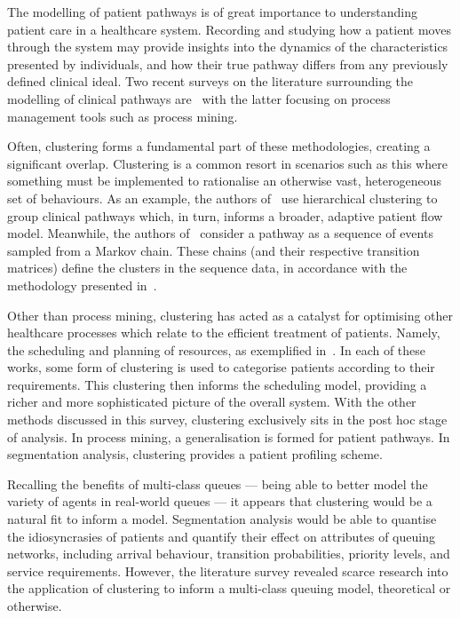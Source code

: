 The modelling of patient pathways is of great importance to understanding
patient care in a healthcare system. Recording and studying how a patient moves
through the system may provide insights into the dynamics of the characteristics
presented by individuals, and how their true pathway differs from any previously
defined clinical ideal. Two recent surveys on the literature surrounding the
modelling of clinical pathways are~\cite{Aspland2019,DeRamonFernandez2019} with
the latter focusing on process management tools such as process mining.

Often, clustering forms a fundamental part of these methodologies, creating a
significant overlap. Clustering is a common resort in scenarios such as
this where something must be implemented to rationalise an otherwise vast,
heterogeneous set of behaviours. As an example, the authors
of~\cite{Prokofyeva2020} use hierarchical clustering to group clinical pathways
which, in turn, informs a broader, adaptive patient flow model. Meanwhile, the
authors of~\cite{Rebuge2012} consider a pathway as a sequence of events sampled
from a Markov chain. These chains (and their respective transition matrices)
define the clusters in the sequence data, in accordance with the methodology
presented in~\cite{Cadez2000}.

Other than process mining, clustering has acted as a catalyst for optimising
other healthcare processes which relate to the efficient treatment of patients.
Namely, the scheduling and planning of resources, as exemplified
in~\cite{Nasir2018,Steins2013,Yousefi2020}. In each of these works, some form of
clustering is used to categorise patients according to their requirements. This
clustering then informs the scheduling model, providing a richer and more
sophisticated picture of the overall system. With the other methods discussed in
this survey, clustering exclusively sits in the post hoc stage of analysis. In
process mining, a generalisation is formed for patient pathways. In segmentation
analysis, clustering provides a patient profiling scheme.

Recalling the benefits of multi-class queues --- being able to better model the
variety of agents in real-world queues --- it appears that clustering would be a
natural fit to inform a model. Segmentation analysis would be able to quantise
the idiosyncrasies of patients and quantify their effect on attributes of
queuing networks, including arrival behaviour, transition probabilities,
priority levels, and service requirements. However, the literature survey
revealed scarce research into the application of clustering to inform a
multi-class queuing model, theoretical or otherwise.


